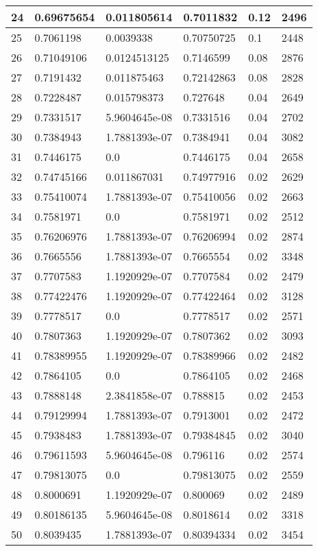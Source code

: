\begin{longtable}{|l|l|l|l|l|l|}
24 & 0.69675654 & 0.011805614 & 0.7011832 & 0.12 & 2496 \\ \hline 
25 & 0.7061198 & 0.0039338 & 0.70750725 & 0.1 & 2448 \\ \hline 
26 & 0.71049106 & 0.0124513125 & 0.7146599 & 0.08 & 2876 \\ \hline 
27 & 0.7191432 & 0.011875463 & 0.72142863 & 0.08 & 2828 \\ \hline 
28 & 0.7228487 & 0.015798373 & 0.727648 & 0.04 & 2649 \\ \hline 
29 & 0.7331517 & 5.9604645e-08 & 0.7331516 & 0.04 & 2702 \\ \hline 
30 & 0.7384943 & 1.7881393e-07 & 0.7384941 & 0.04 & 3082 \\ \hline 
31 & 0.7446175 & 0.0 & 0.7446175 & 0.04 & 2658 \\ \hline 
32 & 0.74745166 & 0.011867031 & 0.74977916 & 0.02 & 2629 \\ \hline 
33 & 0.75410074 & 1.7881393e-07 & 0.75410056 & 0.02 & 2663 \\ \hline 
34 & 0.7581971 & 0.0 & 0.7581971 & 0.02 & 2512 \\ \hline 
35 & 0.76206976 & 1.7881393e-07 & 0.76206994 & 0.02 & 2874 \\ \hline 
36 & 0.7665556 & 1.7881393e-07 & 0.7665554 & 0.02 & 3348 \\ \hline 
37 & 0.7707583 & 1.1920929e-07 & 0.7707584 & 0.02 & 2479 \\ \hline 
38 & 0.77422476 & 1.1920929e-07 & 0.77422464 & 0.02 & 3128 \\ \hline 
39 & 0.7778517 & 0.0 & 0.7778517 & 0.02 & 2571 \\ \hline 
40 & 0.7807363 & 1.1920929e-07 & 0.7807362 & 0.02 & 3093 \\ \hline 
41 & 0.78389955 & 1.1920929e-07 & 0.78389966 & 0.02 & 2482 \\ \hline 
42 & 0.7864105 & 0.0 & 0.7864105 & 0.02 & 2468 \\ \hline 
43 & 0.7888148 & 2.3841858e-07 & 0.788815 & 0.02 & 2453 \\ \hline 
44 & 0.79129994 & 1.7881393e-07 & 0.7913001 & 0.02 & 2472 \\ \hline 
45 & 0.7938483 & 1.7881393e-07 & 0.79384845 & 0.02 & 3040 \\ \hline 
46 & 0.79611593 & 5.9604645e-08 & 0.796116 & 0.02 & 2574 \\ \hline 
47 & 0.79813075 & 0.0 & 0.79813075 & 0.02 & 2559 \\ \hline 
48 & 0.8000691 & 1.1920929e-07 & 0.800069 & 0.02 & 2489 \\ \hline 
49 & 0.80186135 & 5.9604645e-08 & 0.8018614 & 0.02 & 3318 \\ \hline 
50 & 0.8039435 & 1.7881393e-07 & 0.80394334 & 0.02 & 3454 \\ \hline 
\end{longtable}